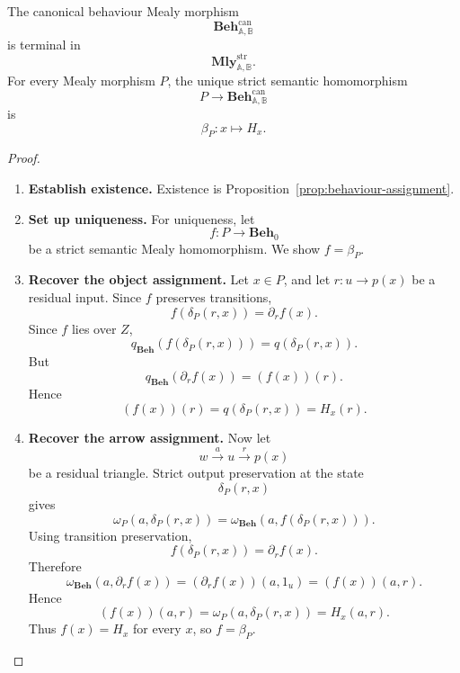 \begin{theorem}
\label{thm:terminal-residual-semantics}
    The canonical behaviour Mealy morphism
    \[
        \mathbf{Beh}^{\mathrm{can}}_{\mathbb A,\mathbb B}
    \]
    is terminal in
    \[
        \mathbf{Mly}^{\mathrm{str}}_{\mathbb A,\mathbb B}.
    \]
    For every Mealy morphism \(P\), the unique strict semantic homomorphism
    \[
        P\to\mathbf{Beh}^{\mathrm{can}}_{\mathbb A,\mathbb B}
    \]
    is
    \[
        \beta_P:x\mapsto H_x.
    \]
\end{theorem}
\begin{proof}
    \leavevmode
    \begin{enumerate}
        \item \textbf{Establish existence.} Existence is Proposition~\ref{prop:behaviour-assignment}.

        \item \textbf{Set up uniqueness.} For uniqueness, let
        \[
            f:P\to\mathbf{Beh}_0
        \]
        be a strict semantic Mealy homomorphism. We show \(f=\beta_P\).

        \item \textbf{Recover the object assignment.} Let \(x\in P\), and let \(r:u\to p(x)\) be a residual input. Since \(f\) preserves transitions,
        \[
            f(\delta_P(r,x))=\partial_r f(x).
        \]
        Since \(f\) lies over \(Z\),
        \[
            q_{\mathbf{Beh}}(f(\delta_P(r,x)))=q(\delta_P(r,x)).
        \]
        But
        \[
            q_{\mathbf{Beh}}(\partial_r f(x))=(f(x))(r).
        \]
        Hence
        \[
            (f(x))(r)=q(\delta_P(r,x))=H_x(r).
        \]

        \item \textbf{Recover the arrow assignment.} Now let
        \[
            w\xrightarrow{a}u\xrightarrow{r}p(x)
        \]
        be a residual triangle. Strict output preservation at the state
        \[
            \delta_P(r,x)
        \]
        gives
        \[
            \omega_P(a,\delta_P(r,x))
            =
            \omega_{\mathbf{Beh}}(a,f(\delta_P(r,x))).
        \]
        Using transition preservation,
        \[
            f(\delta_P(r,x))=\partial_r f(x).
        \]
        Therefore
        \[
            \omega_{\mathbf{Beh}}(a,\partial_r f(x))
            =
            (\partial_r f(x))(a,1_u)
            =
            (f(x))(a,r).
        \]
        Hence
        \[
            (f(x))(a,r)
            =
            \omega_P(a,\delta_P(r,x))
            =
            H_x(a,r).
        \]
        Thus \(f(x)=H_x\) for every \(x\), so \(f=\beta_P\).


\end{enumerate}
\end{proof}
